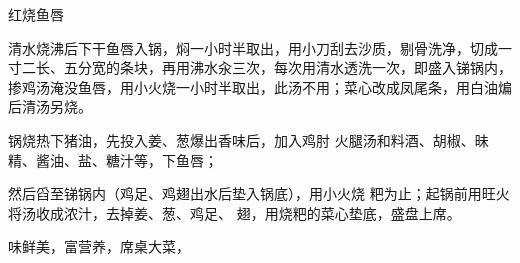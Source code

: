 \begin{recipe}{红烧鱼唇}

\ingredients


\cooking

\step 清水烧沸后下干鱼唇入锅，焖一小时半取出，用小刀刮去沙质，剔骨洗净，切成一寸二长、五分宽的条块，再用沸水汆三次，每次用清水透洗一次，即盛入锑锅内，掺鸡汤淹没鱼唇，用小火烧一小时半取出，此汤不用；菜心改成凤尾条，用白油煸后清汤另烧。

锅烧热下猪油，先投入姜、葱爆出香味后，加入鸡肘 火腿汤和料酒、胡椒、昧精、酱油、盐、糖汁等，下鱼唇；

然后舀至锑锅内（鸡足、鸡翅出水后垫入锅底），用小火烧 粑为止；起锅前用旺火将汤收成浓汁，去掉姜、葱、鸡足、 翅，用烧粑的菜心垫底，盛盘上席。

\notes

味鲜美，富营养，席桌大菜，

\end{recipe}

